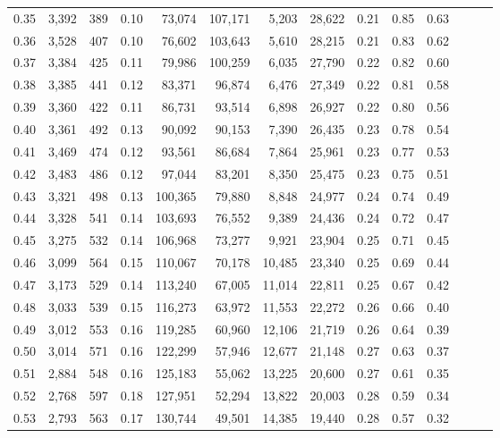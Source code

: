 \begin{tabular}{rrrrrrrrrrrrrr}
0.35 &  3,392 &  389 &  0.10 &   73,074 &  107,171 &   5,203 &  28,622 &  0.21 &  0.85 &      0.63 \\
0.36 &  3,528 &  407 &  0.10 &   76,602 &  103,643 &   5,610 &  28,215 &  0.21 &  0.83 &      0.62 \\
0.37 &  3,384 &  425 &  0.11 &   79,986 &  100,259 &   6,035 &  27,790 &  0.22 &  0.82 &      0.60 \\
0.38 &  3,385 &  441 &  0.12 &   83,371 &   96,874 &   6,476 &  27,349 &  0.22 &  0.81 &      0.58 \\
0.39 &  3,360 &  422 &  0.11 &   86,731 &   93,514 &   6,898 &  26,927 &  0.22 &  0.80 &      0.56 \\
0.40 &  3,361 &  492 &  0.13 &   90,092 &   90,153 &   7,390 &  26,435 &  0.23 &  0.78 &      0.54 \\
0.41 &  3,469 &  474 &  0.12 &   93,561 &   86,684 &   7,864 &  25,961 &  0.23 &  0.77 &      0.53 \\
0.42 &  3,483 &  486 &  0.12 &   97,044 &   83,201 &   8,350 &  25,475 &  0.23 &  0.75 &      0.51 \\
0.43 &  3,321 &  498 &  0.13 &  100,365 &   79,880 &   8,848 &  24,977 &  0.24 &  0.74 &      0.49 \\
0.44 &  3,328 &  541 &  0.14 &  103,693 &   76,552 &   9,389 &  24,436 &  0.24 &  0.72 &      0.47 \\
0.45 &  3,275 &  532 &  0.14 &  106,968 &   73,277 &   9,921 &  23,904 &  0.25 &  0.71 &      0.45 \\
0.46 &  3,099 &  564 &  0.15 &  110,067 &   70,178 &  10,485 &  23,340 &  0.25 &  0.69 &      0.44 \\
0.47 &  3,173 &  529 &  0.14 &  113,240 &   67,005 &  11,014 &  22,811 &  0.25 &  0.67 &      0.42 \\
0.48 &  3,033 &  539 &  0.15 &  116,273 &   63,972 &  11,553 &  22,272 &  0.26 &  0.66 &      0.40 \\
0.49 &  3,012 &  553 &  0.16 &  119,285 &   60,960 &  12,106 &  21,719 &  0.26 &  0.64 &      0.39 \\
0.50 &  3,014 &  571 &  0.16 &  122,299 &   57,946 &  12,677 &  21,148 &  0.27 &  0.63 &      0.37 \\
0.51 &  2,884 &  548 &  0.16 &  125,183 &   55,062 &  13,225 &  20,600 &  0.27 &  0.61 &      0.35 \\
0.52 &  2,768 &  597 &  0.18 &  127,951 &   52,294 &  13,822 &  20,003 &  0.28 &  0.59 &      0.34 \\
0.53 &  2,793 &  563 &  0.17 &  130,744 &   49,501 &  14,385 &  19,440 &  0.28 &  0.57 &      0.32 \\

\end{tabular}
